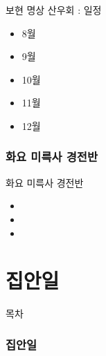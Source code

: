 \documentclass[aspectratio=1610,17pt,xcolor=pdftex,dvipsnames,table,handout]{beamer}
\begin{document}
		\begin{frame} [t,plain]
			\begin{block} {보현 명상 산우회 : 일정}
			\begin{itemize}
				\item 8월
				\item 9월
				\item 10월
				\item 11월
				\item 12월
			\end{itemize}
			\end{block}
		\end{frame}



		\section{화요 미륵사 경전반}

		\begin{frame} [t,plain]
			\begin{block} {화요 미륵사 경전반}
			\begin{itemize}
				\item 
				\item 
				\item 
			\end{itemize}
			\end{block}
		\end{frame}


		\part{집안일}
		\frame{\partpage}


		\begin{frame} [plain]{목차}
		\tableofcontents
		\end{frame}
		


		\section{집안일}
		\frame [plain] {\sectionpage}
\end{document}
